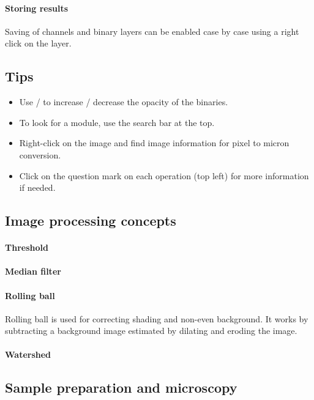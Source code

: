 \paragraph{Storing results}

Saving of channels and binary layers can be enabled case by case using a right click on the layer. 

\subsection{Tips}
\begin{itemize}
    \item Use \keys{\Alt+\arrowkeyup} / \keys{\Alt+\arrowkeydown}  to increase / decrease the opacity of the binaries.
    \item To look for a module, use the search bar at the top.
    \item Right-click on the image and find image information for pixel to micron conversion.
    \item Click on the question mark on each operation (top left) for more information if needed.
\end{itemize}

\subsection{Image processing concepts}

\paragraph{Threshold}

\paragraph{Median filter} 

\paragraph{Rolling ball} Rolling ball is used for correcting shading and non-even background. It works by subtracting a background image estimated by dilating and eroding the image.

\paragraph{Watershed}



\subsection{Sample preparation and microscopy}

